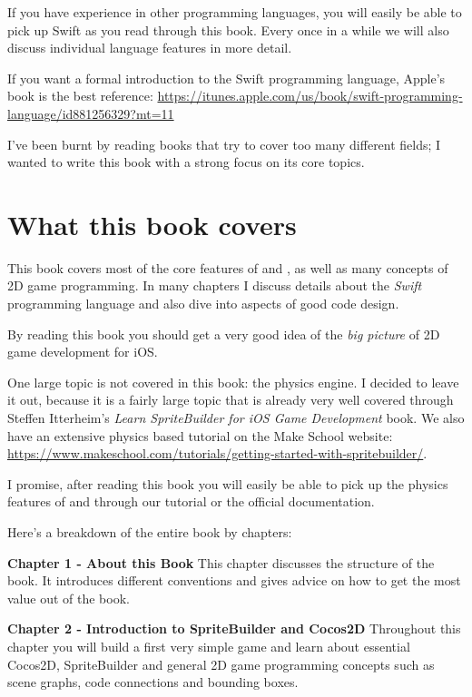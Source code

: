 If you have experience in other programming languages, you will easily be able
to pick up Swift as you read through this book. Every once in a while we will
also discuss individual language features in more detail.

If you want a formal introduction to the Swift programming language, Apple's
book is the best reference:
\url{https://itunes.apple.com/us/book/swift-programming-language/id881256329?mt=11}

I've been burnt by reading books that try to cover too many different fields; I
wanted to write this book with a strong focus on its core topics.

\section{What this book covers}
This book covers most of the core features of \SB{} and \cocos{}, as well as
many concepts of 2D game programming. In many chapters I discuss details about
the \textit{Swift} programming language and also dive into aspects of good code
design. 

By reading this book you should get a very good idea of the \textit{big picture}
of 2D game development for iOS.

One large topic is not covered in this book: the \cocos{} physics engine. I
decided to leave it out, because it is a fairly large topic that is already very
well covered through Steffen Itterheim's \textit{Learn SpriteBuilder for iOS
Game Development} book. We also have an extensive physics based tutorial on the
Make School website:
\url{https://www.makeschool.com/tutorials/getting-started-with-spritebuilder/}.

I promise, after reading this book you will easily be able to pick up the
physics features of \SB{} and \cocos{} through our tutorial or the official
documentation.

Here's a breakdown of the entire book by chapters:

\textbf{Chapter 1 - About this Book}\newline
This chapter discusses the structure of the book. It introduces different conventions and gives advice on how to get the most value out of the book.


\textbf{Chapter 2 - Introduction to SpriteBuilder and Cocos2D}\newline
Throughout this chapter you will build a first very simple game and learn about essential Cocos2D, SpriteBuilder and general 2D game programming concepts such as scene graphs, code connections and bounding boxes.


